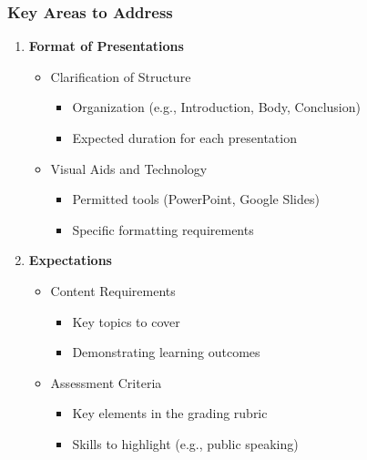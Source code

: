 \documentclass[aspectratio=169]{beamer}
\begin{document}
\begin{frame}[fragile]
    \frametitle{Key Areas to Address}
    \begin{enumerate}
        \item \textbf{Format of Presentations}
        \begin{itemize}
            \item Clarification of Structure
                \begin{itemize}
                    \item Organization (e.g., Introduction, Body, Conclusion)
                    \item Expected duration for each presentation
                \end{itemize}
            \item Visual Aids and Technology
                \begin{itemize}
                    \item Permitted tools (PowerPoint, Google Slides)
                    \item Specific formatting requirements
                \end{itemize}
        \end{itemize}
        
        \item \textbf{Expectations}
        \begin{itemize}
            \item Content Requirements
                \begin{itemize}
                    \item Key topics to cover
                    \item Demonstrating learning outcomes
                \end{itemize}
            \item Assessment Criteria
                \begin{itemize}
                    \item Key elements in the grading rubric
                    \item Skills to highlight (e.g., public speaking)
                \end{itemize}
        \end{itemize}
        

\end{enumerate}
\end{frame}
\end{document}
